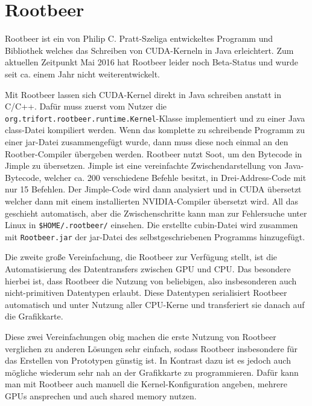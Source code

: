 \chapter{Rootbeer}
\label{sct:rootbeer}

Rootbeer\cite{pratt2012rootbeer} ist ein von Philip C. Pratt-Szeliga entwickeltes Programm und Bibliothek welches das Schreiben von CUDA-Kerneln in Java erleichtert. Zum aktuellen Zeitpunkt Mai 2016 hat Rootbeer leider noch Beta-Status und wurde seit ca. einem Jahr nicht weiterentwickelt\cite{rootbeergithub}.

Mit Rootbeer lassen sich CUDA-Kernel direkt in Java schreiben anstatt in C/C++. Dafür muss zuerst vom Nutzer die \texttt{org.trifort.rootbeer.runtime.Kernel}-Klasse implementiert und zu einer Java class-Datei kompiliert werden.
Wenn das komplette zu schreibende Programm zu einer jar-Datei zusammengefügt wurde, dann muss diese noch einmal an den Rootber-Compiler übergeben werden. Rootbeer nutzt Soot\cite{sootsite,sootretrospective}, um den Bytecode in Jimple zu übersetzen. Jimple ist eine vereinfachte Zwischendarstellung von Java-Bytecode, welcher ca. 200 verschiedene Befehle besitzt, in Drei-Address-Code mit nur 15 Befehlen.
Der Jimple-Code wird dann analysiert und in CUDA übersetzt welcher dann mit einem installierten NVIDIA-Compiler übersetzt wird. All das geschieht automatisch, aber die Zwischenschritte kann man zur Fehlersuche unter Linux in \lstinline!$HOME/.rootbeer/! einsehen.
Die erstellte cubin-Datei wird zusammen mit \texttt{Rootbeer.jar} der jar-Datei des selbstgeschriebenen Programms hinzugefügt.

Die zweite große Vereinfachung, die Rootbeer zur Verfügung stellt, ist die Automatisierung des Datentransfers zwischen GPU und CPU. Das besondere hierbei ist, dass Rootbeer die Nutzung von beliebigen, also insbesonderen auch nicht-primitiven Datentypen erlaubt. Diese Datentypen serialisiert Rootbeer automatisch und unter Nutzung aller CPU-Kerne und transferiert sie danach auf die Grafikkarte.

Diese zwei Vereinfachungen obig machen die erste Nutzung von Rootbeer verglichen zu anderen Lösungen sehr einfach, sodass Rootbeer insbesondere für das Erstellen von Prototypen günstig ist.
In Kontrast dazu ist es jedoch auch mögliche wiederum sehr nah an der Grafikkarte zu programmieren. Dafür kann man mit Rootbeer auch manuell die Kernel-Konfiguration angeben, mehrere GPUs ansprechen und auch shared memory nutzen.


